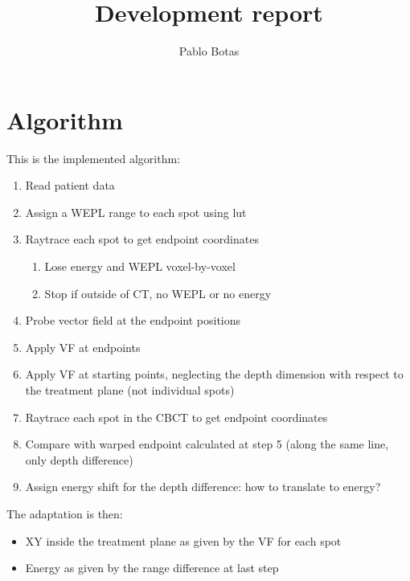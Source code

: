 \documentclass{article}
\title{Development report}
\author{Pablo Botas}
\begin{document}
\maketitle



\section{Algorithm}

This is the implemented algorithm:

\begin{enumerate}
    \item Read patient data
    \item Assign a WEPL range to each spot using lut
    \item Raytrace each spot to get endpoint coordinates
    \begin{enumerate}
        \item Lose energy and WEPL voxel-by-voxel
        \item Stop if outside of CT, no WEPL or no energy
    \end{enumerate}
    \item Probe vector field at the endpoint positions
    \item Apply VF at endpoints
    \item Apply VF at starting points, neglecting the depth dimension with respect to the treatment plane (not individual spots)
    \item Raytrace each spot in the CBCT to get endpoint coordinates
    \item Compare with warped endpoint calculated at step 5 (along the same line, only depth difference)
    \item Assign energy shift for the depth difference: how to translate to energy?
\end{enumerate}

The adaptation is then:
\begin{itemize}
    \item XY inside the treatment plane as given by the VF for each spot
    \item Energy as given by the range difference at last step
\end{itemize}
\end{document}
